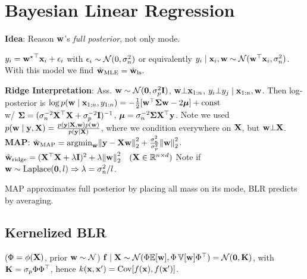 \section{Bayesian Linear Regression}

\textbf{Idea}: Reason \(\vb{w}\)'s \textit{full posterior}, not only mode.

\begin{definition}[Model]
    \(y_i = {\vb{w}^\star}^\top \vb{x}_i + \epsilon_i\) with \(\epsilon_i \sim \operatorname{\mathcal{N}}(0, \sigma_n^2)\) or equivalently \(y_i \mid \vb{x}_i, \vb{w} \sim \operatorname{\mathcal{N}}(\vb{w}^\top \vb{x}_i, \sigma_n^2)\).
    With this model we find \(\hat{\vb{w}}_{\text{MLE}}  = \hat{\vb{w}}_{\text{ls}}\).
\end{definition}

\begin{colored}
    \textbf{Ridge Interpretation}: Ass. \(\vb{w} \sim \operatorname{\mathcal{N}}(\vb{0}, \sigma_p^2\vb{I})\), \(\vb{w} \bot \vb{x}_{1:n}\), \(y_i \bot y_j \mid \vb{x}_{1:n}, \vb{w}\). Then log-posterior is
    \(\log p(\vb{w} \mid \vb{x}_{1:n}, y_{1:n}) = -\frac{1}{2} [\vb{w}^\top \vb*{\Sigma} \vb{w} - 2\vb*{\mu}] + \text{const}\) \\
    w/ \(\vb*{\Sigma} = (\sigma_n^{-2}\vb{X}^\top\vb{X} + \sigma_p^{-2}\vb{I})^{-1}\), \(\vb*{\mu}=\sigma_n^{-2}\vb*{\Sigma}\vb{X}^\top\vb{y}\).
    Note we used \(p(\vb{w} \mid \vb{y}, \vb{X}) = \frac{p(\vb{y} \mid \vb{X}, \vb{w})p(\vb{w})}{p(\vb{y}\mid\vb{X})}\), where we condition everywhere on \(\vb{X}\), but \(\vb{w} \bot \vb{X}\).
    \textbf{MAP}: \(\hat{\vb{w}}_{\text{MAP}} = \text{argmin}_{\vb{w}} \norm{\vb{y} - \vb{X}\vb{w}}_2^2 + \frac{\sigma_n^2}{\sigma_p^2}\norm{\vb{w}}_2^2\).
    \(\hat{\vb{w}}_{\text{ridge}} = (\vb{X}^\top\vb{X} + \lambda \vb{I})^2 + \lambda\norm{\vb{w}}_2^2 \quad (\vb{X}\in\mathbb{R}^{n \times d})\)
    Note if \(\vb{w} \sim \operatorname{Laplace}(\vb{0}, l) \Rightarrow \lambda = \sigma_n^2/l\).
\end{colored}

MAP approximates full posterior by placing all mass on its mode, BLR predicts by averaging.

\begin{definition}[Inf.]

\end{definition}

\subsection{Kernelized BLR}
\begin{definition} (\(\Phi = \phi(\vb{X})\), prior \(\vb{w} \sim \operatorname{\mathcal{N}}\))
    \(\vb{f} \mid \vb{X} \sim \operatorname{\mathcal{N}}(\Phi \mathbb{E}[\vb{w}], \Phi\operatorname{\mathbb{V}}[\vb{w}]\Phi^\top) = \operatorname{\mathcal{N}}(\vb{0}, \vb{K})\), with \(\vb{K} = \sigma_p\Phi\Phi^\top\), hence \(k(\vb{x}, \vb{x}') = \operatorname{Cov}[f(\vb{x}), f(\vb{x}')]\).
\end{definition}

